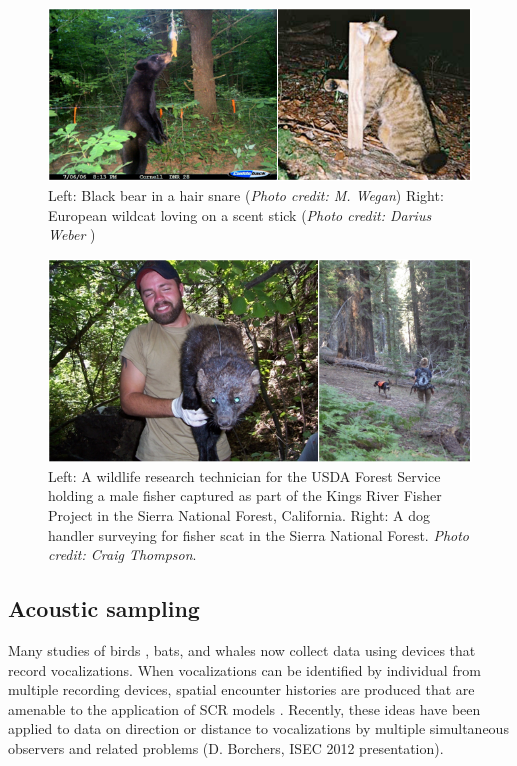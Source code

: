 \begin{figure}
\begin{center}
\includegraphics[width=5in]{Ch1/figs/bearcat}
\end{center}
\caption{Left:  Black bear in a hair snare ({\it Photo credit: M. Wegan})
Right: European wildcat loving on a scent stick ({\it Photo credit: Darius
Weber
})
}
\label{fig.bearcat}
\end{figure}


\begin{figure}
\begin{center}
\includegraphics[width=5in]{Ch1/figs/beardog}
\end{center}
\caption{Left:
A wildlife research technician for the USDA Forest Service
  holding a male fisher  captured as part of the Kings River Fisher
  Project in the Sierra National Forest, California.
Right: A dog handler surveying for fisher scat in the Sierra National Forest.
{\it Photo credit: Craig Thompson}.}
\label{fig.fisherscatdog}
\end{figure}


\subsection{Acoustic sampling}

Many studies of birds \citep{dawson_efford:2009}, bats, and whales
\citep{marques_etal:2009} now collect data using devices that record
vocalizations. When vocalizations can be identified by individual from
multiple recording devices, spatial encounter histories are produced
that are amenable to the application of SCR models
\citep{dawson_efford:2009, efford_etal:2009ecol}. Recently, these
ideas have been applied to data on direction  or distance to
vocalizations by multiple simultaneous observers and related problems
(D. Borchers, ISEC 2012 presentation).


